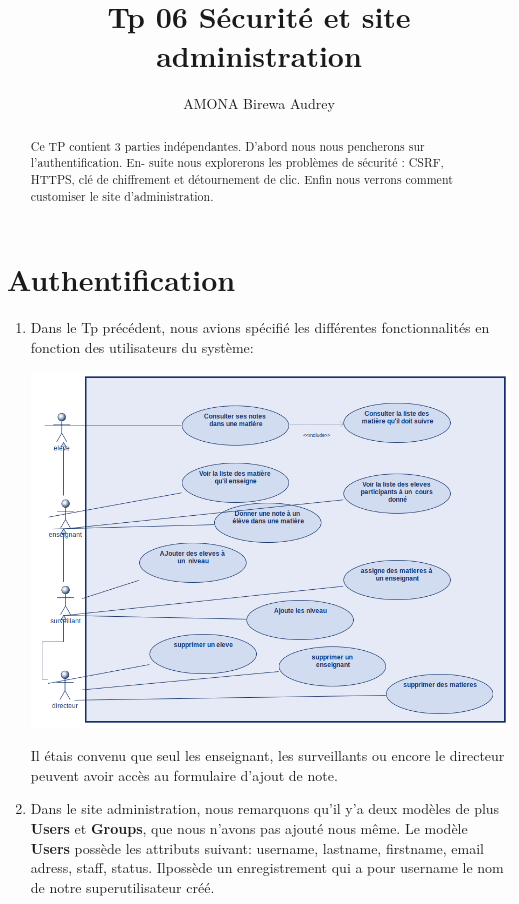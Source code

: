 \documentclass[11pt,a4paper]{article}
\author{AMONA Birewa Audrey}
\title{ Tp 06 Sécurité et site administration }
\begin{document}
\maketitle
\tableofcontents
\begin{abstract}
Ce TP contient 3 parties indépendantes. D’abord nous nous pencherons sur l’authentification. En-
suite nous explorerons les problèmes de sécurité : CSRF, HTTPS, clé de chiffrement et détournement
de clic. Enfin nous verrons comment customiser le site d’administration.
\end{abstract}
\section{Authentification}
\begin{enumerate}
\item Dans le Tp précédent, nous avions spécifié les différentes fonctionnalités en fonction des utilisateurs du système:
\begin{center}
\includegraphics[scale=0.4]{images/cas.png}
\end{center}
Il étais convenu que seul les enseignant, les surveillants ou encore le directeur peuvent avoir accès au formulaire d'ajout de note.
\item Dans le site administration, nous remarquons qu'il y'a deux modèles de plus \textbf{ Users} et \textbf{Groups}, que nous n'avons pas ajouté nous même. Le modèle \textbf{Users} possède les attributs suivant: username, lastname, firstname, email adress, staff, status. Ilpossède un enregistrement qui a pour username le nom de notre superutilisateur créé.


\end{enumerate}
\end{document}
